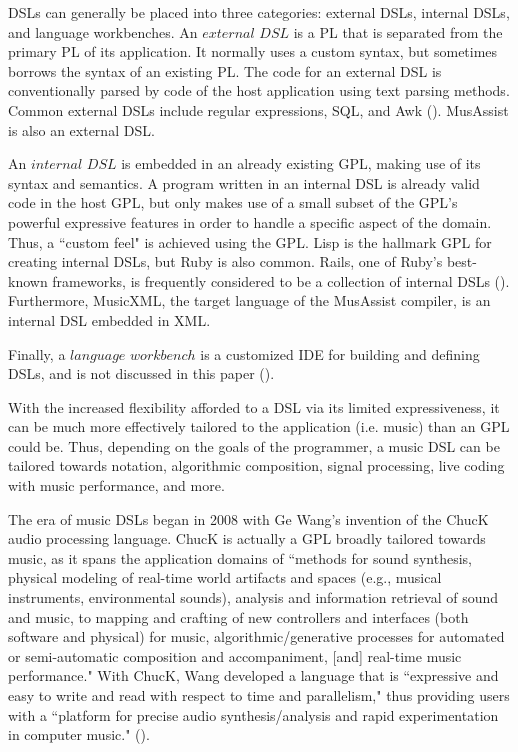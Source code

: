 \documentclass{report}
\newcommand\citeparen[1]{(\cite{#1})}
\begin{document}
DSLs can generally be placed into three categories: external DSLs, internal DSLs, and language workbenches. An $external$ $DSL$ is a PL that is separated  from the primary PL of its application. It normally uses a custom syntax, but sometimes borrows the syntax of an existing PL. The code for an external DSL is conventionally parsed by code of the host application using text parsing methods. Common external DSLs include regular expressions, SQL, and Awk  \citeparen{fowler_parsons_2011}. MusAssist is also an external DSL.

An $internal$ $DSL$ is embedded in an already existing GPL, making use  of its  syntax and semantics. A program written in an internal DSL is already valid code in the host GPL, but only makes use of a small subset of the GPL's powerful expressive features in order to handle a specific aspect of the domain. Thus, a ``custom feel" is achieved using the GPL. Lisp is the hallmark GPL for creating internal DSLs, but Ruby is also common. Rails, one of Ruby's best-known frameworks, is frequently considered to be a collection of internal DSLs   \citeparen{fowler_parsons_2011}. Furthermore, MusicXML, the target language of the MusAssist compiler, is an internal DSL embedded in XML.

Finally, a $ language$ $workbench$ is a customized IDE for building and defining DSLs, and is not discussed in this paper \citeparen{fowler_parsons_2011}. 

With the increased flexibility afforded to  a DSL via its limited expressiveness, it can be much  more effectively tailored to the application (i.e. music) than an GPL could be. Thus, depending on the goals of the programmer, a music DSL can be tailored towards notation, algorithmic composition, signal processing, live coding with music performance, and more. 

The era of music DSLs began in 2008  with Ge Wang's invention of the ChucK audio processing language. ChucK is actually a GPL broadly tailored towards music, as it spans the application domains of ``methods for sound synthesis, physical modeling of real-time world artifacts and spaces (e.g., musical instruments, environmental sounds), analysis and information retrieval of sound and music, to mapping and crafting of new controllers and interfaces (both software and physical) for music, algorithmic/generative processes for automated or semi-automatic composition and accompaniment, [and] real-time music performance." With ChucK, Wang developed a language that is ``expressive and easy to write and read with respect to time and parallelism," thus providing users with a ``platform for precise audio synthesis/analysis and rapid experimentation in computer music." \citeparen{wang_2008}. 
\end{document}
